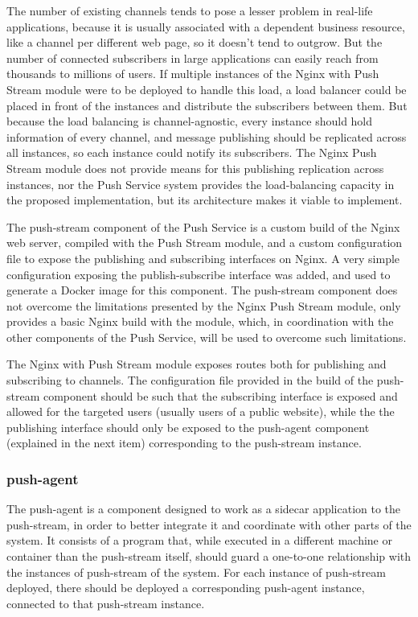 The number of existing channels tends to pose a lesser problem in real-life applications, because it is usually associated with a dependent business resource, like a channel per different web page, so it doesn't tend to outgrow. But the number of connected subscribers in large applications can easily reach from thousands to millions of users. If multiple instances of the Nginx with Push Stream module were to be deployed to handle this load, a load balancer could be placed in front of the instances and distribute the subscribers between them. But because the load balancing is channel-agnostic, every instance should hold information of every channel, and message publishing should be replicated across all instances, so each instance could notify its subscribers. The Nginx Push Stream module does not provide means for this publishing replication across instances, nor the Push Service system provides the load-balancing capacity in the proposed implementation, but its architecture makes it viable to implement.

The push-stream component of the Push Service is a custom build of the Nginx web server, compiled with the Push Stream module, and a custom configuration file to expose the publishing and subscribing interfaces on Nginx. A very simple configuration exposing the publish-subscribe interface was added, and used to generate a Docker image for this component. The push-stream component does not overcome the limitations presented by the Nginx Push Stream module, only provides a basic Nginx build with the module, which, in coordination with the other components of the Push Service, will be used to overcome such limitations.

The Nginx with Push Stream module exposes routes both for publishing and subscribing to channels. The configuration file provided in the build of the push-stream component should be such that the subscribing interface is exposed and allowed for the targeted users (usually users of a public website), while the the publishing interface should only be exposed to the push-agent component (explained in the next item) corresponding to the push-stream instance.


\subsubsection{push-agent}

The push-agent is a component designed to work as a sidecar application to the push-stream, in order to better integrate it and coordinate with other parts of the system. It consists of a program that, while executed in a different machine or container than the push-stream itself, should guard a one-to-one relationship with the instances of push-stream of the system. For each instance of push-stream deployed, there should be deployed a corresponding push-agent instance, connected to that push-stream instance.

